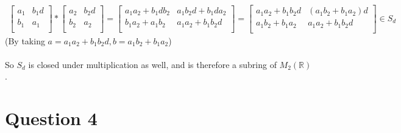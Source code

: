 \documentclass{article}
\begin{document}
\begin{align*}
\left[ {\begin{array}{cc}
   a_1 & b_1 d \\
   b_1 & a_1 \\
  \end{array} } \right] * 
  \left[ {\begin{array}{cc}
   a_2 & b_2 d \\
   b_2 & a_2 \\
  \end{array} } \right] = 
  \left[ {\begin{array}{cc}
   a_1 a_2 + b_1 d b_2 & a_1 b_2 d + b_1 d a_2 \\
   b_1 a_2 + a_1 b_2  & a_1 a_2 + b_1 b_2 d \\
  \end{array} } \right] = \left[ {\begin{array}{cc}
   a_1 a_2 + b_1 b_2 d & (a_1 b_2 + b_1 a_2)d \\
   a_1 b_2 + b_1 a_2 & a_1 a_2 + b_1 b_2 d \\
  \end{array} } \right] \in S_d
\end{align*}
(By taking \(a = a_1 a_2 + b_1 b_2 d, b = a_1 b_2 + b_1 a_2\))
\\\\
So \(S_d\) is closed under multiplication as well, and is therefore a subring of \(M_2(\mathds{R})\).

\section*{Question 4}
\end{document}
